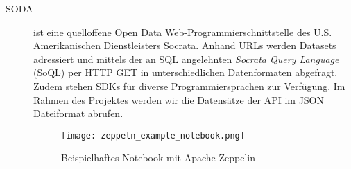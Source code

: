 \begin{description}
	\item[\ac{SODA}] ist eine quelloffene Open Data Web-Programmierschnittstelle des U.S. Amerikanischen Dienstleisters Socrata. Anhand URLs werden Datasets adressiert und mittels der an SQL angelehnten \textit{Socrata Query Language} (SoQL) per HTTP GET in unterschiedlichen Datenformaten abgefragt. Zudem stehen \acp{SDK} für diverse Programmiersprachen zur Verfügung. Im Rahmen des Projektes werden wir die Datensätze der \ac{API} im \ac{JSON} Dateiformat abrufen.\autocite{soda.api}
	\begin{figure}[h]
		\centering
		\texttt{[image: zeppeln\_example\_notebook.png]}
		\caption[Beispielhaftes Notebook mit Apache Zeppelin]{Beispielhaftes Notebook mit Apache Zeppelin\autocite{zeppelin.image}}
		\label{fig:zeppeln_example_notebook}
	\end{figure}
\end{description}
